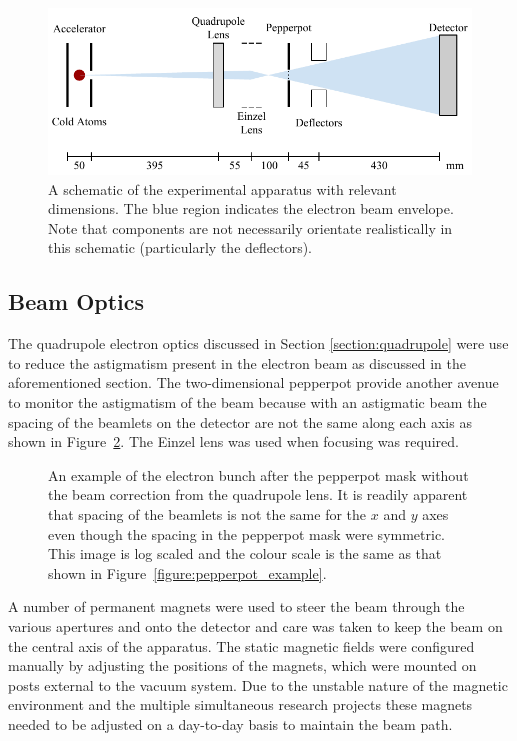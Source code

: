 \begin{figure}
\center
\includegraphics{part2/Figs/EmittanceApparatusSchematic.pdf}
\caption[Brightness measurement apparatus with dimensions.]{A schematic of the experimental apparatus with relevant dimensions. The blue region indicates the electron beam envelope. Note that components are not necessarily orientate realistically in this schematic (particularly the deflectors).}
\label{figure:emittance_schematic}
\end{figure}

\subsection{Beam Optics}
The quadrupole electron optics discussed in Section \ref{section:quadrupole} were use to reduce the astigmatism present in the electron beam as discussed in the aforementioned section.
The two-dimensional pepperpot provide another avenue to monitor the astigmatism of the beam because with an astigmatic beam the spacing of the beamlets on the detector are not the same along each axis as shown in Figure~\ref{figure:astigmatic_pepperpot}.
The Einzel lens was used when focusing was required.

\begin{figure}
    \center
    
    \caption[Pepperpot measurements with and without beam astigmatism correction.]{An example of the electron bunch after the pepperpot mask without the beam correction from the quadrupole lens. It is readily apparent that spacing of the beamlets is not the same for the $x$ and $y$ axes even though the spacing in the pepperpot mask were symmetric. This image is log scaled and the colour scale is the same as that shown in Figure~\ref{figure:pepperpot_example}.}
    \label{figure:astigmatic_pepperpot}
\end{figure}

A number of permanent magnets were used to steer the beam through the various apertures and onto the detector and care was taken to keep the beam on the central axis of the apparatus.
The static magnetic fields were configured manually by adjusting the positions of the magnets, which were mounted on posts external to the vacuum system.
Due to the unstable nature of the magnetic environment and the multiple simultaneous research projects these magnets needed to be adjusted on a day-to-day basis to maintain the beam path.

